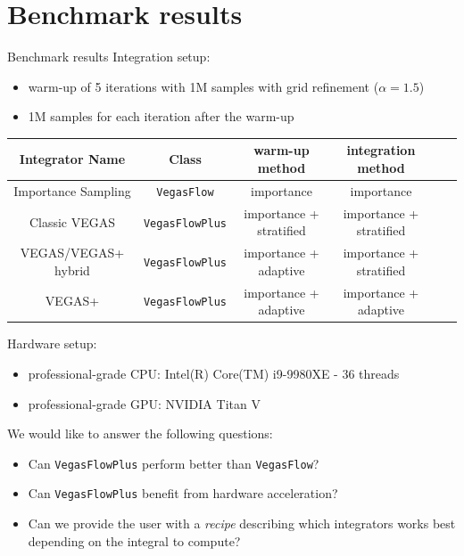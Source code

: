 \documentclass[t,handout,professionalfont,serif]{beamer}
\begin{document}
\section{Benchmark results}

\begin{frame}{Benchmark results}
	\scriptsize
	Integration setup:
	\begin{itemize}
		\item warm-up of 5 iterations with 1M samples with grid refinement ($\alpha=1.5$)
		\item 1M samples for each iteration after the warm-up 
	\end{itemize}
\tiny
	\begin{table}
		\centering
		\begin{tabular}{c| c| c| c | c | c   } 
			Integrator Name & Class & warm-up method& integration method  \\
			\hline
			Importance Sampling & \texttt{VegasFlow} & importance & importance \\ 
			Classic VEGAS & \texttt{VegasFlowPlus}& importance + stratified & importance + stratified \\
			VEGAS/VEGAS+ hybrid  & \texttt{VegasFlowPlus} & importance + adaptive & importance + stratified \\
			VEGAS+ & \texttt{VegasFlowPlus}& importance + adaptive & importance + adaptive \\ 
			\hline
			
		\end{tabular}
		\label{only table}
	\end{table}
\scriptsize

Hardware setup:
\begin{itemize}
	\item professional-grade CPU: Intel(R) Core(TM) i9-9980XE - 36 threads
	\item professional-grade GPU: NVIDIA Titan V
\end{itemize}

\vspace{0.5cm}
We would like to answer the following questions:
\begin{itemize}
	\item Can \texttt{VegasFlowPlus} perform better than \texttt{VegasFlow}?
	\item Can \texttt{VegasFlowPlus} benefit from hardware acceleration?
	\item Can we provide the user with a \emph{recipe} describing which integrators works best depending on the integral to compute?
\end{itemize}	
	
\end{frame}
\end{document}
